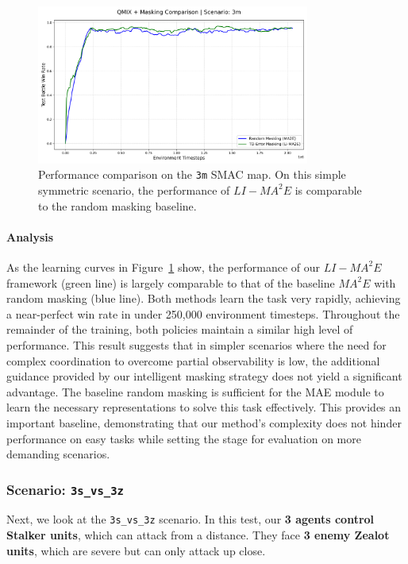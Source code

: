 \begin{figure}[h]
    \centering
    \includegraphics[width=0.8\textwidth]{images_pfe/results_li-ma2e/comparison_plot_3m.png}
    \caption{Performance comparison on the \texttt{3m} SMAC map. On this simple symmetric scenario, the performance of $LI-{MA}^2E$ is comparable to the random masking baseline.}
    \label{fig:3m}
\end{figure}

\paragraph{Analysis}
As the learning curves in Figure~\ref{fig:3m} show, the performance of our $LI-{MA}^2E$ framework (green line) is largely comparable to that of the baseline ${MA}^2E$ with random masking (blue line). Both methods learn the task very rapidly, achieving a near-perfect win rate in under 250,000 environment timesteps. Throughout the remainder of the training, both policies maintain a similar high level of performance.
This result suggests that in simpler scenarios where the need for complex coordination to overcome partial observability is low, the additional guidance provided by our intelligent masking strategy does not yield a significant advantage. The baseline random masking is sufficient for the MAE module to learn the necessary representations to solve this task effectively. This provides an important baseline, demonstrating that our method's complexity does not hinder performance on easy tasks while setting the stage for evaluation on more demanding scenarios.

\subsubsection{Scenario: \texttt{3s\_vs\_3z}}
Next, we look at the \texttt{3s\_vs\_3z} scenario. In this test, our \textbf{3 agents control Stalker units}, which can attack from a distance. They face \textbf{3 enemy Zealot units}, which are severe but can only attack up close.

